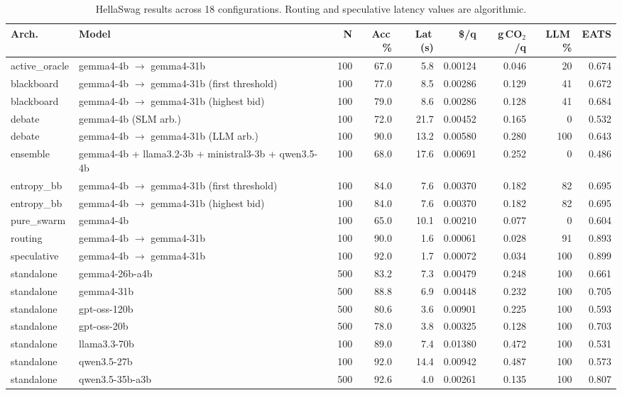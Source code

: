 \begin{table}[htbp]
\centering
\caption{HellaSwag results across 18 configurations. Routing and speculative latency values are algorithmic.}
\label{tab:result-hellaswag}
\scriptsize
\renewcommand{\arraystretch}{1.15}
\begin{tabularx}{\linewidth}{@{} l X r r r r r r r @{}}
\toprule
\textbf{Arch.} & \textbf{Model} & \textbf{N} & \textbf{Acc\,\%} & \textbf{Lat\,(s)} & \textbf{\$/q} & \textbf{g\,CO$_2$/q} & \textbf{LLM\,\%} & \textbf{EATS} \\
\midrule
active\_oracle & gemma4-4b $\rightarrow$ gemma4-31b & 100 & 67.0 & 5.8 & 0.00124 & 0.046 & 20 & 0.674 \\
blackboard & gemma4-4b $\rightarrow$ gemma4-31b (first threshold) & 100 & 77.0 & 8.5 & 0.00286 & 0.129 & 41 & 0.672 \\
blackboard & gemma4-4b $\rightarrow$ gemma4-31b (highest bid) & 100 & 79.0 & 8.6 & 0.00286 & 0.128 & 41 & 0.684 \\
debate & gemma4-4b (SLM arb.) & 100 & 72.0 & 21.7 & 0.00452 & 0.165 & 0 & 0.532 \\
debate & gemma4-4b $\rightarrow$ gemma4-31b (LLM arb.) & 100 & 90.0 & 13.2 & 0.00580 & 0.280 & 100 & 0.643 \\
ensemble & gemma4-4b + llama3.2-3b + ministral3-3b + qwen3.5-4b & 100 & 68.0 & 17.6 & 0.00691 & 0.252 & 0 & 0.486 \\
entropy\_bb & gemma4-4b $\rightarrow$ gemma4-31b (first threshold) & 100 & 84.0 & 7.6 & 0.00370 & 0.182 & 82 & 0.695 \\
entropy\_bb & gemma4-4b $\rightarrow$ gemma4-31b (highest bid) & 100 & 84.0 & 7.6 & 0.00370 & 0.182 & 82 & 0.695 \\
pure\_swarm & gemma4-4b & 100 & 65.0 & 10.1 & 0.00210 & 0.077 & 0 & 0.604 \\
routing & gemma4-4b $\rightarrow$ gemma4-31b & 100 & 90.0 & 1.6 & 0.00061 & 0.028 & 91 & 0.893 \\
speculative & gemma4-4b $\rightarrow$ gemma4-31b & 100 & 92.0 & 1.7 & 0.00072 & 0.034 & 100 & 0.899 \\
standalone & gemma4-26b-a4b & 500 & 83.2 & 7.3 & 0.00479 & 0.248 & 100 & 0.661 \\
standalone & gemma4-31b & 500 & 88.8 & 6.9 & 0.00448 & 0.232 & 100 & 0.705 \\
standalone & gpt-oss-120b & 500 & 80.6 & 3.6 & 0.00901 & 0.225 & 100 & 0.593 \\
standalone & gpt-oss-20b & 500 & 78.0 & 3.8 & 0.00325 & 0.128 & 100 & 0.703 \\
standalone & llama3.3-70b & 100 & 89.0 & 7.4 & 0.01380 & 0.472 & 100 & 0.531 \\
standalone & qwen3.5-27b & 100 & 92.0 & 14.4 & 0.00942 & 0.487 & 100 & 0.573 \\
standalone & qwen3.5-35b-a3b & 500 & 92.6 & 4.0 & 0.00261 & 0.135 & 100 & 0.807 \\
\bottomrule
\end{tabularx}
\end{table}

